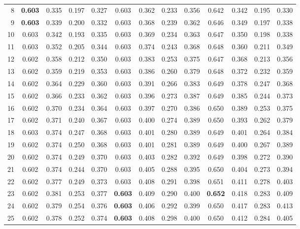 \documentclass[11pt,a4paper]{article}
\begin{document}
\begin{landscape}
\begin{table}[p]
\begin{tabular}{rcccccccccccc}
8 & \textbf{0.603} & 0.335 & 0.197 & 0.327 & 0.603 & 0.362 & 0.233 & 0.356 & 0.642 & 0.342 & 0.195 & 0.330 \\
9 & \textbf{0.603} & 0.339 & 0.200 & 0.332 & 0.603 & 0.368 & 0.239 & 0.362 & 0.646 & 0.349 & 0.197 & 0.338 \\
10 & 0.603 & 0.342 & 0.193 & 0.335 & 0.603 & 0.369 & 0.234 & 0.363 & 0.647 & 0.350 & 0.198 & 0.338 \\
11 & 0.603 & 0.352 & 0.205 & 0.344 & 0.603 & 0.374 & 0.243 & 0.368 & 0.648 & 0.360 & 0.211 & 0.349 \\
12 & 0.602 & 0.358 & 0.212 & 0.350 & 0.603 & 0.383 & 0.253 & 0.375 & 0.647 & 0.368 & 0.213 & 0.356 \\
13 & 0.602 & 0.359 & 0.219 & 0.353 & 0.603 & 0.386 & 0.260 & 0.379 & 0.648 & 0.372 & 0.232 & 0.359 \\
14 & 0.602 & 0.364 & 0.229 & 0.360 & 0.603 & 0.391 & 0.266 & 0.383 & 0.649 & 0.378 & 0.247 & 0.368 \\
15 & 0.602 & 0.366 & 0.233 & 0.362 & 0.603 & 0.396 & 0.273 & 0.387 & 0.649 & 0.385 & 0.244 & 0.373 \\
\midrule
16 & 0.602 & 0.370 & 0.234 & 0.364 & 0.603 & 0.397 & 0.270 & 0.386 & 0.650 & 0.389 & 0.253 & 0.375 \\
17 & 0.602 & 0.371 & 0.240 & 0.367 & 0.603 & 0.400 & 0.274 & 0.389 & 0.650 & 0.393 & 0.262 & 0.379 \\
18 & 0.603 & 0.374 & 0.247 & 0.368 & 0.603 & 0.401 & 0.280 & 0.389 & 0.649 & 0.401 & 0.264 & 0.384 \\
19 & 0.602 & 0.374 & 0.250 & 0.368 & 0.603 & 0.401 & 0.281 & 0.389 & 0.649 & 0.400 & 0.267 & 0.389 \\
20 & 0.602 & 0.374 & 0.249 & 0.370 & 0.603 & 0.403 & 0.282 & 0.392 & 0.649 & 0.398 & 0.272 & 0.390 \\
21 & 0.602 & 0.374 & 0.244 & 0.370 & 0.603 & 0.405 & 0.288 & 0.395 & 0.650 & 0.404 & 0.273 & 0.394 \\
22 & 0.602 & 0.377 & 0.249 & 0.373 & 0.603 & 0.408 & 0.291 & 0.398 & 0.651 & 0.411 & 0.278 & 0.403 \\
23 & 0.602 & 0.381 & 0.253 & 0.377 & \textbf{0.603} & 0.409 & 0.290 & 0.400 & \textbf{0.652} & 0.418 & 0.283 & 0.409 \\
\midrule
24 & 0.602 & 0.379 & 0.254 & 0.376 & \textbf{0.603} & 0.406 & 0.292 & 0.399 & 0.650 & 0.417 & 0.283 & 0.413 \\
25 & 0.602 & 0.378 & 0.252 & 0.374 & \textbf{0.603} & 0.408 & 0.298 & 0.400 & 0.650 & 0.412 & 0.284 & 0.405 \\

\end{tabular}
\end{table}
\end{landscape}
\end{document}
